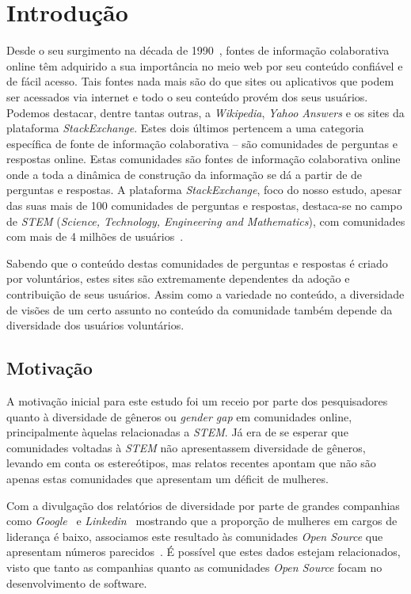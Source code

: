 \chapter{Introdução}
\label{ch:intro}

Desde o seu surgimento na década de 1990~\cite{wikipedia:history}, fontes de informação colaborativa online têm adquirido a sua importância no meio web por seu conteúdo confiável e de fácil acesso. Tais fontes nada mais são do que sites ou aplicativos que podem ser acessados via internet e todo o seu conteúdo provém dos seus usuários. Podemos destacar, dentre tantas outras, a \emph{Wikipedia}, \emph{Yahoo Answers} e os sites da plataforma \emph{StackExchange}. Estes dois últimos pertencem a uma categoria específica de fonte de informação colaborativa -- são comunidades de perguntas e respostas online. Estas comunidades são fontes de informação colaborativa online onde a toda a dinâmica de construção da informação se dá a partir de de perguntas e respostas. A plataforma \emph{StackExchange}, foco do nosso estudo, apesar das suas mais de 100 comunidades de perguntas e respostas, destaca-se no campo de \emph{STEM} (\emph{Science, Technology, Engineering and Mathematics}), com comunidades com mais de 4 milhões de usuários~\cite{stackexchange}. 

Sabendo que o conteúdo destas comunidades de perguntas e respostas é criado por voluntários, estes sites são extremamente dependentes da adoção e contribuição de seus usuários. Assim como a variedade no conteúdo, a diversidade de visões de um certo assunto no conteúdo da comunidade também depende da diversidade dos usuários voluntários.

\section{Motivação}

A motivação inicial para este estudo foi um receio por parte dos pesquisadores quanto à diversidade de gêneros ou \emph{gender gap} em comunidades online, principalmente àquelas relacionadas a \emph{STEM}. Já era de se esperar que comunidades voltadas à \emph{STEM} não apresentassem diversidade de gêneros, levando em conta os estereótipos, mas relatos recentes apontam que não são apenas estas comunidades que apresentam um déficit de mulheres. 

Com a divulgação dos relatórios de diversidade por parte de grandes companhias como \emph{Google}~\cite{google:report} e \emph{Linkedin}~\cite{linkedin:report} mostrando que a proporção de mulheres em cargos de liderança é baixo, associamos este resultado às comunidades \emph{Open Source} que apresentam números parecidos~\cite{rustad2011suck}. É possível que estes dados estejam relacionados, visto que tanto as companhias quanto as comunidades \emph{Open Source} focam no desenvolvimento de software.

